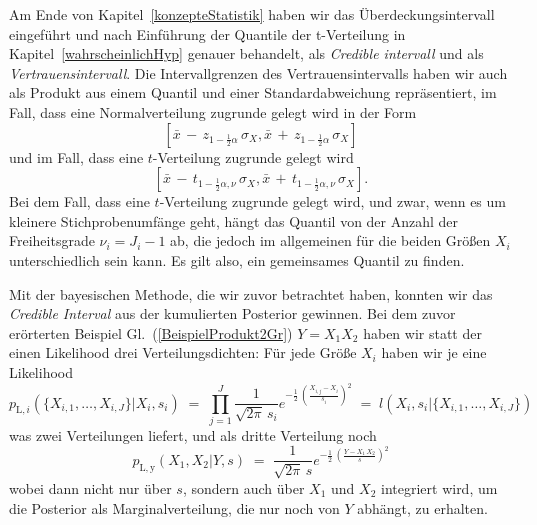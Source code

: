 Am Ende von Kapitel~\ref{konzepteStatistik} haben wir das Überdeckungsintervall eingeführt
und nach Einführung der Quantile der t-Verteilung in Kapitel~\ref{wahrscheinlichHyp} genauer
behandelt, als \textsl{Credible intervall} und als \textsl{Vertrauensintervall}.
Die Intervallgrenzen des Vertrauensintervalls haben wir
auch als Produkt aus einem Quantil und einer Standardabweichung repräsentiert, im Fall, dass
eine Normalverteilung zugrunde gelegt wird in der Form
\begin{equation}
\left[\bar x \, - \, z_{1-\frac{1}{2}\alpha} \, \sigma_X, 
\bar x \, + \, z_{1-\frac{1}{2}\alpha} \, \sigma_X \right]
\end{equation}
und im Fall, dass eine $t$-Verteilung zugrunde gelegt wird
\begin{equation}
\left[\bar x \, - \, t_{1-\frac{1}{2}\alpha, \nu} \, \sigma_X, 
\bar x \, + \, t_{1-\frac{1}{2}\alpha, \nu} \, \sigma_X \right] .
\end{equation}
Bei dem Fall, dass eine $t$-Verteilung zugrunde gelegt wird, und zwar, wenn es um kleinere
Stichprobenumfänge geht, hängt das Quantil von der Anzahl der Freiheitsgrade $\nu_i = J_i - 1$
ab, die jedoch im allgemeinen für die beiden Größen $X_i$
unterschiedlich sein kann. Es gilt also, ein gemeinsames Quantil zu finden.

Mit der bayesischen Methode, die wir zuvor betrachtet haben, konnten wir das
\textsl{Credible Interval} aus der kumulierten Posterior gewinnen. Bei dem
zuvor erörterten Beispiel Gl.~(\ref{BeispielProdukt2Gr}) $Y = X_1 X_2$ haben wir statt
der einen Likelihood drei Verteilungsdichten:
Für jede Größe $X_i$ haben wir je eine Likelihood
\begin{equation}
p_{\mathrm{L},i}(\{X_{i,1}, \dots, X_{i,J}\} | X_i, s_i) \; = \;
\prod\limits_{j=1}^J \frac{1}{\sqrt{2 \pi} \, s_i}
 e^{- \frac{1}{2} \, \left( \frac{X_{i,j} - X_i}{s_i} \right)^2 }  \; = \;
l(X_i, s_i | \{X_{i,1}, \dots, X_{i,J}\})
\end{equation}
was zwei Verteilungen liefert, und als dritte Verteilung noch
\begin{equation}
p_\mathrm{L,y}( X_1, X_2 | Y, s) \; = \;
\frac{1}{\sqrt{2 \pi} \, s}
 e^{- \frac{1}{2} \, \left( \frac{Y - X_1 \, X_2}{s} \right)^2 } 
\end{equation}
wobei dann nicht nur über $s$, sondern auch über $X_1$ und $X_2$ integriert wird, um die
Posterior als Marginalverteilung, die nur noch von $Y$ abhängt, zu erhalten.

